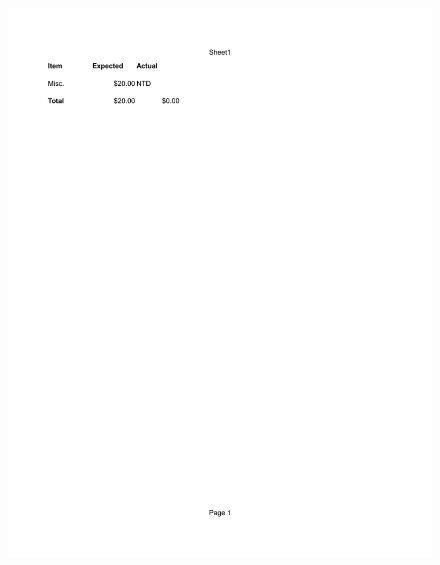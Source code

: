 \documentclass[a4paper,11pt]{texMemo}
\begin{document}
\begin{figure}[ht]
\includegraphics[scale=.75]{Budget_Project.pdf}
\end{figure}
\end{document}
